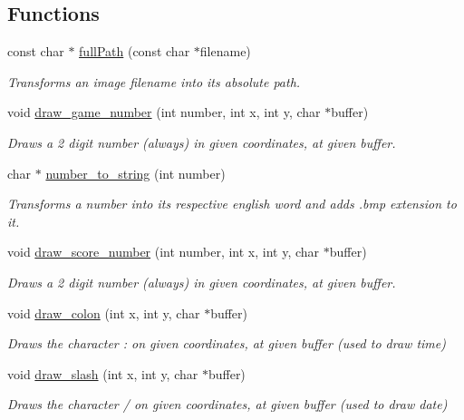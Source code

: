 \subsection*{Functions}
\begin{DoxyCompactItemize}
\item 
const char $\ast$ \hyperlink{group__utils_gacd89c22fdefa32a68bfff93637677a38}{full\+Path} (const char $\ast$filename)
\begin{DoxyCompactList}\small\item\em Transforms an image filename into its absolute path. \end{DoxyCompactList}\item 
void \hyperlink{group__utils_ga1d3f15b906cf55d88a42ff86d9035978}{draw\+\_\+game\+\_\+number} (int number, int x, int y, char $\ast$buffer)
\begin{DoxyCompactList}\small\item\em Draws a 2 digit number (always) in given coordinates, at given buffer. \end{DoxyCompactList}\item 
char $\ast$ \hyperlink{group__utils_gac1f5ea8c8660adf99729789da39cf9ce}{number\+\_\+to\+\_\+string} (int number)
\begin{DoxyCompactList}\small\item\em Transforms a number into its respective english word and adds .bmp extension to it. \end{DoxyCompactList}\item 
void \hyperlink{group__utils_ga6c6627d0ed2f743fc34057524d37296f}{draw\+\_\+score\+\_\+number} (int number, int x, int y, char $\ast$buffer)
\begin{DoxyCompactList}\small\item\em Draws a 2 digit number (always) in given coordinates, at given buffer. \end{DoxyCompactList}\item 
void \hyperlink{group__utils_ga7f8f4adbdf567fe397208152fec35363}{draw\+\_\+colon} (int x, int y, char $\ast$buffer)
\begin{DoxyCompactList}\small\item\em Draws the character \textquotesingle{}\+:\textquotesingle{} on given coordinates, at given buffer (used to draw time) \end{DoxyCompactList}\item 
void \hyperlink{group__utils_ga189285abfa4707506b6d32a68639c755}{draw\+\_\+slash} (int x, int y, char $\ast$buffer)
\begin{DoxyCompactList}\small\item\em Draws the character \textquotesingle{}/\textquotesingle{} on given coordinates, at given buffer (used to draw date) \end{DoxyCompactList}\item 

\end{DoxyCompactItemize}
